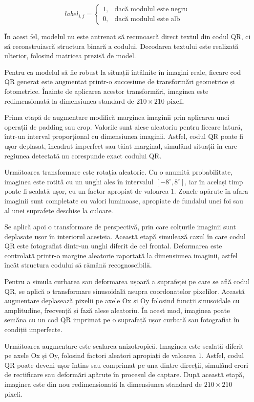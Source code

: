 \[
    label_{i,j} =
    \begin{cases}
        1, & \text{dacă modulul este negru} \\
        0, & \text{dacă modulul este alb}
    \end{cases}
\]

În acest fel, modelul nu este antrenat să recunoască direct textul din codul QR, ci să reconstruiască structura binară a codului. Decodarea textului este realizată ulterior, folosind matricea prezisă de model.

Pentru ca modelul să fie robust la situații întâlnite în imagini reale, fiecare cod QR generat este augmentat printr-o succesiune de transformări geometrice și fotometrice. Înainte de aplicarea acestor transformări, imaginea este redimensionată la dimensiunea standard de $210 \times 210$ pixeli.

Prima etapă de augmentare modifică marginea imaginii prin aplicarea unei operații de padding sau crop. Valorile sunt alese aleatoriu pentru fiecare latură, într-un interval proporțional cu dimensiunea imaginii. Astfel, codul QR poate fi ușor deplasat, încadrat imperfect sau tăiat marginal, simulând situații în care regiunea detectată nu corespunde exact codului QR.

Următoarea transformare este rotația aleatorie. Cu o anumită probabilitate, imaginea este rotită cu un unghi ales în intervalul $[-8^\circ, 8^\circ]$, iar în același timp poate fi scalată ușor, cu un factor apropiat de valoarea $1$. Zonele apărute în afara imaginii sunt completate cu valori luminoase, apropiate de fundalul unei foi sau al unei suprafețe deschise la culoare.

Se aplică apoi o transformare de perspectivă, prin care colțurile imaginii sunt deplasate ușor în interiorul acesteia. Această etapă simulează cazul în care codul QR este fotografiat dintr-un unghi diferit de cel frontal. Deformarea este controlată printr-o margine aleatorie raportată la dimensiunea imaginii, astfel încât structura codului să rămână recognoscibilă.

Pentru a simula curbarea sau deformarea ușoară a suprafeței pe care se află codul QR, se aplică o transformare sinusoidală asupra coordonatelor pixelilor. Această augmentare deplasează pixelii pe axele Ox și Oy folosind funcții sinusoidale cu amplitudine, frecvență și fază alese aleatoriu. În acest mod, imaginea poate semăna cu un cod QR imprimat pe o suprafață ușor curbată sau fotografiat în condiții imperfecte.

Următoarea augmentare este scalarea anizotropică. Imaginea este scalată diferit pe axele Ox și Oy, folosind factori aleatori apropiați de valoarea $1$. Astfel, codul QR poate deveni ușor întins sau comprimat pe una dintre direcții, simulând erori de rectificare sau deformări apărute în procesul de captare. După această etapă, imaginea este din nou redimensionată la dimensiunea standard de $210 \times 210$ pixeli.


